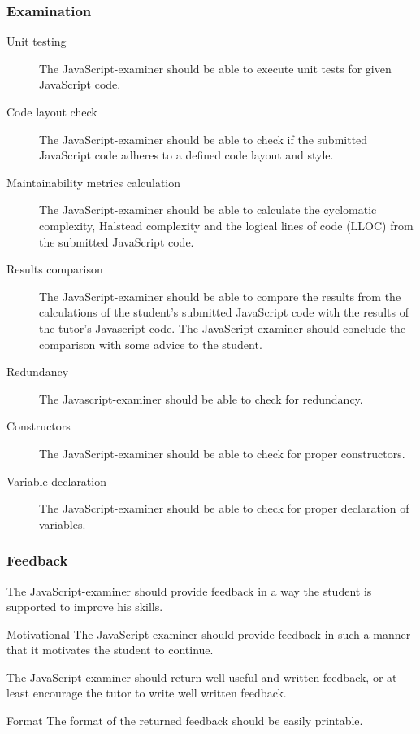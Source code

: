 \documentclass{article}
\begin{document}
\subsubsection{Examination}
\begin{description}
  \item[Unit testing] The JavaScript-examiner should be able to execute unit 
    tests for given JavaScript code.
  \item[Code layout check] The JavaScript-examiner should be able to check if 
    the submitted JavaScript code adheres to a defined code layout and style.
  \item[Maintainability metrics calculation] The JavaScript-examiner should be 
    able to calculate the cyclomatic complexity, Halstead complexity and the 
    logical lines of code (LLOC) from the submitted JavaScript code.
  \item[Results comparison] The JavaScript-examiner should be able to compare
    the results from the calculations of the student's submitted JavaScript
    code with the results of the tutor's Javascript code. The
    JavaScript-examiner should conclude the comparison with some advice to the
    student.
  \item[Redundancy] The Javascript-examiner should be able to check for
    redundancy.
  \item[Constructors] The JavaScript-examiner should be able to check for
    proper constructors.
  \item[Variable declaration] The JavaScript-examiner should be able to check
    for proper declaration of variables.
\end{description}

\subsubsection{Feedback}
\begin{description}
  \item[Useful] The JavaScript-examiner should provide feedback in a way
    the student is supported to improve his skills.
  \item{Motivational} The JavaScript-examiner should provide feedback in such a
    manner that it motivates the student to continue.
  \item[Elegance] The JavaScript-examiner should return well useful and written 
    feedback, or at least encourage the tutor to write well written feedback.
  \item{Format} The format of the returned feedback should be easily printable.
\end{description}
\end{document}
